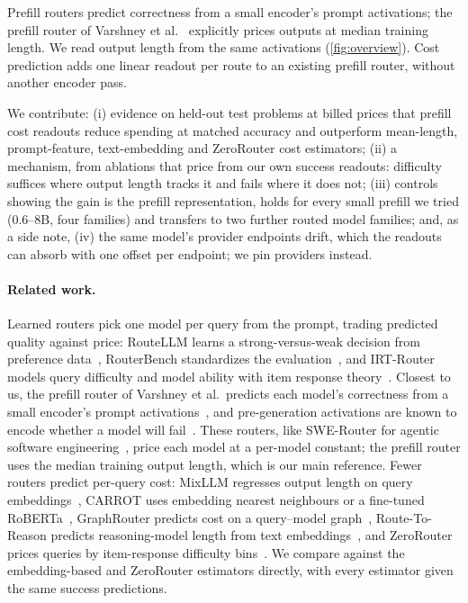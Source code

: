 \documentclass[10pt,twocolumn,letterpaper]{article}
\begin{document}
Prefill routers predict correctness from a small encoder's prompt activations; the prefill router of Varshney et al.~\cite{prefill} explicitly prices outputs at median training length. We read output length from the same activations (\cref{fig:overview}). Cost prediction adds one linear readout per route to an existing prefill router, without another encoder pass.

We contribute: (i) evidence on held-out test problems at billed prices that prefill cost readouts reduce spending at matched accuracy and outperform mean-length, prompt-feature, text-embedding and ZeroRouter cost estimators; (ii) a mechanism, from ablations that price from our own success readouts: difficulty suffices where output length tracks it and fails where it does not; (iii) controls showing the gain is the prefill representation, holds for every small prefill we tried (0.6--8B, four families) and transfers to two further routed model families; and, as a side note, (iv) the same model's provider endpoints drift, which the readouts can absorb with one offset per endpoint; we pin providers instead.

\paragraph{Related work.}
Learned routers pick one model per query from the prompt, trading predicted quality against price: RouteLLM learns a strong-versus-weak decision from preference data~\cite{routellm}, RouterBench standardizes the evaluation~\cite{routerbench}, and IRT-Router models query difficulty and model ability with item response theory~\cite{irtrouter}. Closest to us, the prefill router of Varshney et al.\ predicts each model's correctness from a small encoder's prompt activations~\cite{prefill}, and pre-generation activations are known to encode whether a model will fail~\cite{encodefailures}. These routers, like SWE-Router for agentic software engineering~\cite{swerouter}, price each model at a per-model constant; the prefill router uses the median training output length, which is our main reference. Fewer routers predict per-query cost: MixLLM regresses output length on query embeddings~\cite{mixllm}, CARROT uses embedding nearest neighbours or a fine-tuned RoBERTa~\cite{carrot}, GraphRouter predicts cost on a query--model graph~\cite{graphrouter}, Route-To-Reason predicts reasoning-model length from text embeddings~\cite{routetoreason}, and ZeroRouter prices queries by item-response difficulty bins~\cite{zerorouter}. We compare against the embedding-based and ZeroRouter estimators directly, with every estimator given the same success predictions.
\end{document}
